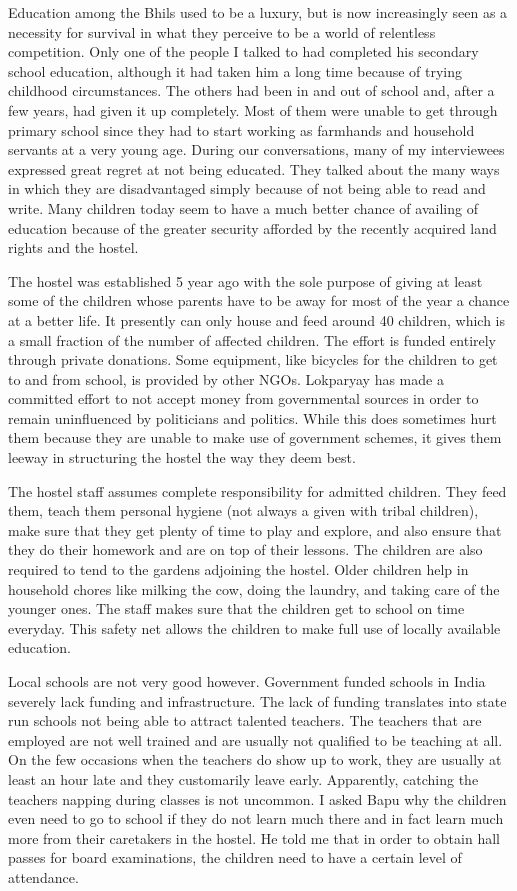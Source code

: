 \documentclass[report.tex]{subfiles}
\begin{document}
Education among the Bhils used to be a luxury, but is now increasingly seen as a necessity for survival in what they perceive to be a world of relentless competition. Only one of the people I talked to had completed his secondary school education, although it had taken him a long time because of trying childhood circumstances. The others had been in and out of school and, after a few years, had given it up completely. Most of them were unable to get through primary school since they had to start working as farmhands and household servants at a very young age. During our conversations, many of my interviewees expressed great regret at not being educated. They talked about the many ways in which they are disadvantaged simply because of not being able to read and write. Many children today seem to have a much better chance of availing of education because of the greater security afforded by the recently acquired land rights and the hostel.

The hostel was established 5 year ago with the sole purpose of giving at least some of the children whose parents have to be away for most of the year a chance at a better life. It presently can only house and feed around 40 children, which is a small fraction of the number of affected children. The effort is funded entirely through private donations. Some equipment, like bicycles for the children to get to and from school, is provided by other NGOs. Lokparyay has made a committed effort to not accept money from governmental sources in order to remain uninfluenced by politicians and politics. While this does sometimes hurt them because they are unable to make use of government schemes, it gives them leeway in structuring the hostel the way they deem best.

The hostel staff assumes complete responsibility for admitted children. They feed them, teach them personal hygiene (not always a given with tribal children), make sure that they get plenty of time to play and explore, and also ensure that they do their homework and are on top of their lessons. The children are also required to tend to the gardens adjoining the hostel. Older children help in household chores like milking the cow, doing the laundry, and taking care of the younger ones. The staff makes sure that the children get to school on time everyday. This safety net allows the children to make full use of locally available education.

Local schools are not very good however. Government funded schools in India severely lack funding and infrastructure. The lack of funding translates into state run schools not being able to attract talented teachers. The teachers that are employed are not well trained and are usually not qualified to be teaching at all. On the few occasions when the teachers do show up to work, they are usually at least an hour late and they customarily leave early. Apparently, catching the teachers napping during classes is not uncommon. I asked Bapu why the children even need to go to school if they do not learn much there and in fact learn much more from their caretakers in the hostel. He told me that in order to obtain hall passes for board examinations, the children need to have a certain level of attendance.
\end{document}
